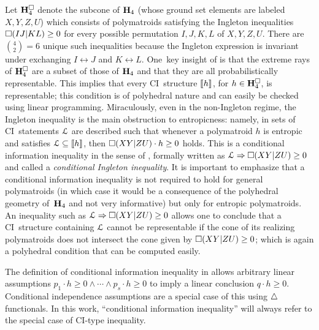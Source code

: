 \documentclass[11pt, a4paper]{tboege-preprint}
\begin{document}
Let $\mathbf{H}_4^\square$ denote the subcone of $\mathbf{H}_4$ (whose ground set
elements are labeled $X,Y,Z,U$) which consists of polymatroids satisfying
the Ingleton inequalities $\CIb{IJ|KL} \ge 0$ for every possible permutation
$I,J,K,L$ of $X,Y,Z,U$. There are $\binom42 = 6$ unique such inequalities
because the Ingleton expression is invariant under exchanging $I \leftrightarrow J$
and $K \leftrightarrow L$.
%
One~key insight of \cite{MatusI} is that the extreme rays of $\mathbf{H}_4^\square$
are a subset of those of $\mathbf{H}_4$ and that they are all probabilistically representable.
This implies that every CI~structure $\llbracket h\rrbracket$, for $h \in \mathbf{H}_4^\square$,
is representable; this condition is of polyhedral nature and can easily be
checked using linear programming.
%
Miraculously, even in the non-Ingleton regime, the Ingleton inequality is
the main obstruction to entropicness: namely, in \cite{MatusIII} sets of
CI~statements $\mathcal{L}$ are described such that whenever a polymatroid $h$ is
entropic and satisfies $\mathcal{L} \subseteq \llbracket h\rrbracket$, then $\CIb{XY|ZU} \cdot h
\ge 0$ holds. This is a conditional information inequality in the sense of
\cite{CondInfo}, formally written as $\CC L \Rightarrow \CIb{XY|ZU} \ge 0$
and called a \emph{conditional Ingleton inequality}. It is important to
emphasize that a conditional information inequality is not required to hold
for general polymatroids (in which case it would be a consequence of the
polyhedral geometry of~$\mathbf{H}_4$ and not very informative) but only for
entropic polymatroids. An inequality such as $\CC L \Rightarrow \CIb{XY|ZU} \ge 0$
allows one to conclude that a CI~structure containing $\mathcal{L}$ cannot be
representable if the cone of its realizing polymatroids does not intersect
the cone given by $\CIb{XY|ZU} \ge 0$; which is again a polyhedral condition
that can be computed easily.

\begin{convention*}
The definition of conditional information inequality in \cite{CondInfo}
allows arbitrary linear assumptions $p_1 \cdot h \ge 0 \wedge \cdots \wedge
p_s \cdot h \ge 0$ to imply a linear conclusion $q \cdot h \ge 0$.
Conditional independence assumptions are a special case of this using
$\triangle$ functionals. In this work, ``conditional information inequality''
will always refer to the special case of CI-type inequality.
\end{convention*}
\end{document}
